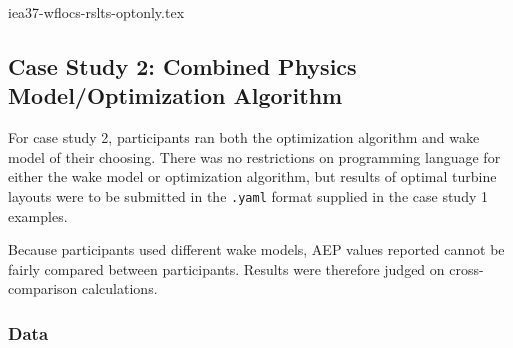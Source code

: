 
	
	{iea37-wflocs-rslts-optonly.tex}

\subsection{Case Study 2: Combined Physics Model/Optimization Algorithm}\label{sec:res-cmbnd}

	For case study 2, participants ran both the optimization algorithm and wake model of their choosing.
	There was no restrictions on programming language for either the wake model or optimization algorithm, but results of optimal turbine layouts were to be submitted in the \texttt{.yaml} format supplied in the case study 1 examples.

	Because participants used different wake models, AEP values reported cannot be fairly compared between participants.
	Results were therefore judged on cross-comparison calculations.

	\subsubsection{Data}

